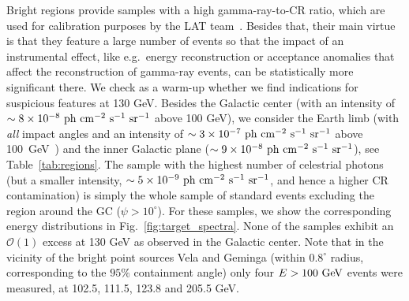 \documentclass[aps,twocolumn,prd,superscriptaddress,showpacs,nofootinbib,fixfloat]{revtex4}
\newcommand{\s}{{\rm ~s}}
\newcommand{\cm}{{\rm ~cm}}
\newcommand{\ph}{{\rm ~ph}}
\newcommand{\sr}{{\rm ~sr}}
\newcommand{\GeV}{{\rm ~GeV}}
\begin{document}
Bright regions provide samples with a high gamma-ray-to-CR ratio,
which are used for calibration purposes by the LAT team~\cite{collaboration:2012kca}.
Besides that, their main virtue is that they feature a large number of events so
that the impact of an instrumental effect, like e.g.~energy
reconstruction or acceptance anomalies that affect the reconstruction of
gamma-ray events, can be statistically more
significant there. 
We check as a warm-up whether we find indications for
suspicious features at 130 GeV.
Besides the Galactic center (with an intensity of $\sim 8\times10^{-8}
\ph\cm^{-2}\s^{-1}\sr^{-1}$ above 100 GeV), we consider the
Earth limb (with \emph{all} impact angles and an intensity of $\sim3\times10^{-7}
\ph \cm^{-2}\s^{-1}\sr^{-1}$ above 100~GeV~\cite{FermiLimb}) and the inner
Galactic plane
($\sim9\times10^{-8}\ph\cm^{-2}\s^{-1}\sr^{-1}$), see
Table~\ref{tab:regions}. 
The sample with the highest number of celestrial photons 
(but a smaller intensity, $\sim5\times10^{-9}\ph\cm^{-2}\s^{-1}\sr^{-1}$, and hence
a higher CR contamination) is
simply the whole sample of
standard events excluding the region around the GC
($\psi>10^\circ$).
For these samples, we show the corresponding energy
distributions in Fig.~\ref{fig:target_spectra}. None of the
samples exhibit an $\mathcal{O}(1)$ excess at 130 GeV as
observed in the Galactic center. Note that in the vicinity
of the bright point sources Vela and Geminga (within
$0.8^\circ$ radius, corresponding to the $95\%$ containment angle) 
only four $E>100\GeV$ events were measured, at
102.5, 111.5, 123.8 and 205.5 GeV.
\medskip
\end{document}
